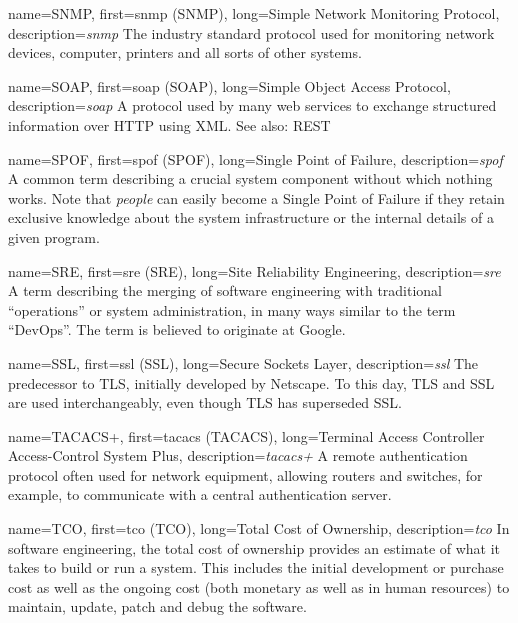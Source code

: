 {
	name={SNMP},
	first={\acrlong{snmp} (SNMP)},
	long={Simple Network Monitoring Protocol},
	description={{\em \acrlong{snmp}} The industry standard
protocol used for monitoring network devices, computer, printers and all
sorts of other systems.}
}

{
	name={SOAP},
	first={\acrlong{soap} (SOAP)},
	long={Simple Object Access Protocol},
	description={{\em \acrlong{soap}} A protocol used by many
web services to exchange structured information over HTTP using XML.  See
also: REST}
}

{
	name={SPOF},
	first={\acrlong{spof} (SPOF)},
	long={Single Point of Failure},
	description={{\em \acrlong{spof}} A common term describing a
crucial system component without which nothing works.  Note that
{\em people} can easily become a Single Point of Failure if they retain
exclusive knowledge about the system infrastructure or the internal
details of a given program.}
}

{
	name={SRE},
	first={\acrlong{sre} (SRE)},
	long={Site Reliability Engineering},
	description={{\em \acrlong{sre}} A term
describing the merging of software engineering with
traditional ``operations'' or system administration,
in many ways similar to the term ``DevOps''.  The term
is believed to originate at Google.
	}
}

{
	name={SSL},
	first={\acrlong{ssl} (SSL)},
	long={Secure Sockets Layer},
	description={{\em \acrlong{ssl}} The predecessor to TLS, initially
developed by Netscape.  To this day, TLS and SSL are used interchangeably,
even though TLS has superseded SSL.}
}

{
	name={TACACS+},
	first={\acrlong{tacacs} (TACACS)},
	long={Terminal Access Controller Access-Control System Plus},
	description={{\em \acrlong{tacacs+}} A remote authentication protocol often used for network equipment,
allowing routers and switches, for example, to communicate with a central
authentication server.}
}

{
	name={TCO},
	first={\acrlong{tco} (TCO)},
	long={Total Cost of Ownership},
	description={{\em \acrlong{tco}} In software engineering, the total
cost of ownership provides an estimate of what it takes to build or run a
system.  This includes the initial development or purchase cost as well as
the ongoing cost (both monetary as well as in human resources) to
maintain, update, patch and debug the software.}
}


